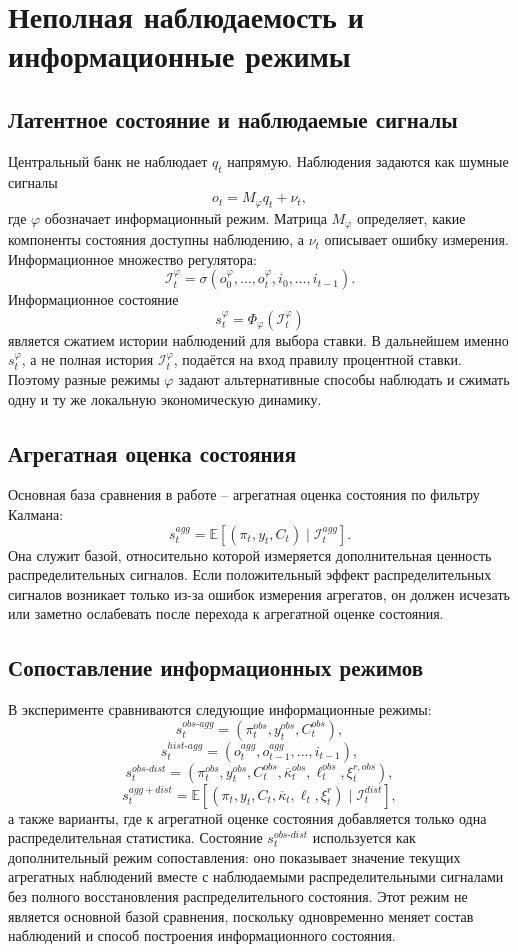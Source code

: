 \section{Неполная наблюдаемость и информационные режимы}

\subsection{Латентное состояние и наблюдаемые сигналы}

Центральный банк не наблюдает \(q_t\) напрямую. Наблюдения задаются как шумные сигналы
\[
o_t=M_\varphi q_t+\nu_t,
\]
где \(\varphi\) обозначает информационный режим. Матрица \(M_\varphi\) определяет, какие
компоненты состояния доступны наблюдению, а \(\nu_t\) описывает ошибку измерения. Информационное
множество регулятора:
\[
\mathcal I_t^\varphi
=
\sigma(o_0^\varphi,\ldots,o_t^\varphi,i_0,\ldots,i_{t-1}).
\]
Информационное состояние
\[
s_t^\varphi=\Phi_\varphi(\mathcal I_t^\varphi)
\]
является сжатием истории наблюдений для выбора ставки. В дальнейшем именно \(s_t^\varphi\), а не
полная история \(\mathcal I_t^\varphi\), подаётся на вход правилу процентной ставки. Поэтому
разные режимы \(\varphi\) задают альтернативные способы наблюдать и сжимать одну и ту же
локальную экономическую динамику.

\subsection{Агрегатная оценка состояния}

Основная база сравнения в работе -- агрегатная оценка состояния по фильтру Калмана:
\[
s_t^{agg}
=
\mathbb E
\left[
(\pi_t,y_t,C_t)\mid \mathcal I_t^{agg}
\right].
\]
Она служит базой, относительно которой измеряется дополнительная ценность распределительных
сигналов. Если положительный эффект распределительных сигналов возникает только из-за ошибок
измерения агрегатов, он должен исчезать или заметно ослабевать после перехода к агрегатной оценке
состояния.

\subsection{Сопоставление информационных режимов}

В эксперименте сравниваются следующие информационные режимы:
\[
s_t^{obs\text{-}agg}=(\pi_t^{obs},y_t^{obs},C_t^{obs}),
\]
\[
s_t^{hist\text{-}agg}=(o_t^{agg},o_{t-1}^{agg},\ldots,i_{t-1}),
\]
\[
s_t^{obs\text{-}dist}
=
(\pi_t^{obs},y_t^{obs},C_t^{obs},
\overline{\kappa}_t^{obs},\ell_t^{obs},\xi_t^{r,obs}),
\]
\[
s_t^{agg+dist}
=
\mathbb E
\left[
(\pi_t,y_t,C_t,\overline{\kappa}_t,\ell_t,\xi_t^r)
\mid
\mathcal I_t^{dist}
\right],
\]
а также варианты, где к агрегатной оценке состояния добавляется только одна распределительная
статистика. Состояние \(s_t^{obs\text{-}dist}\) используется как дополнительный режим
сопоставления: оно показывает значение текущих агрегатных наблюдений вместе с наблюдаемыми
распределительными сигналами без полного восстановления распределительного состояния. Этот режим
не является основной базой сравнения, поскольку одновременно меняет состав наблюдений и способ
построения информационного состояния.

